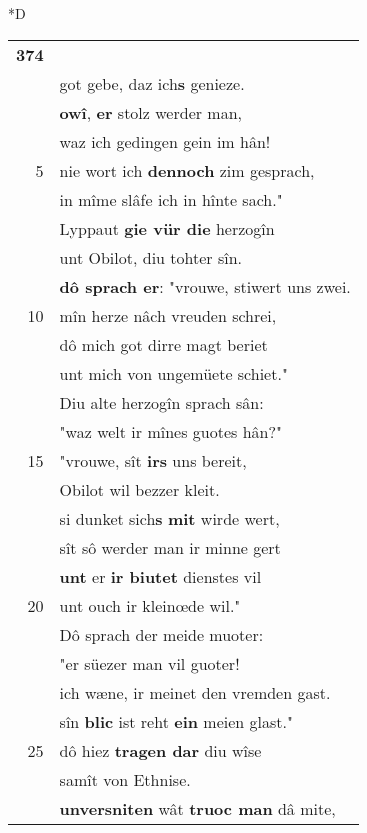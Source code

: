 \documentclass[8pt,a4paper,notitlepage]{article}
\begin{document}
\begin{table}[ht]
\begin{minipage}[t]{0.5\linewidth}
\small
\begin{center}*D
\end{center}
\begin{tabular}{rl}
\textbf{374} & \textit{\begin{large}O\end{large}}b dich halt dîn muoter lieze.\\ 
 & got gebe, daz ich\textbf{s} genieze.\\ 
 & \textbf{owî}, \textbf{er} stolz werder man,\\ 
 & waz ich gedingen gein im hân!\\ 
5 & nie wort ich \textbf{dennoch} zim gesprach,\\ 
 & in mîme slâfe ich in hînte sach."\\ 
 & Lyppaut \textbf{gie vür die} herzogîn\\ 
 & unt Obilot, diu tohter sîn.\\ 
 & \textbf{dô sprach er}: "vrouwe, stiwert uns zwei.\\ 
10 & mîn herze nâch vreuden schrei,\\ 
 & dô mich got dirre magt beriet\\ 
 & unt mich von ungemüete schiet."\\ 
 & Diu alte herzogîn sprach sân:\\ 
 & "waz welt ir mînes guotes hân?"\\ 
15 & "vrouwe, sît \textbf{irs} uns bereit,\\ 
 & Obilot wil bezzer kleit.\\ 
 & si dunket sich\textbf{s} \textbf{mit} wirde wert,\\ 
 & sît sô werder man ir minne gert\\ 
 & \textbf{unt} er \textbf{ir biutet} dienstes vil\\ 
20 & unt ouch ir kleinœde wil."\\ 
 & Dô sprach der meide muoter:\\ 
 & "er süezer man vil guoter!\\ 
 & ich wæne, ir meinet den vremden gast.\\ 
 & sîn \textbf{blic} ist reht \textbf{ein} meien glast."\\ 
25 & dô hiez \textbf{tragen dar} diu wîse\\ 
 & samît von Ethnise.\\ 
 & \textbf{unversniten} wât \textbf{truoc man} dâ mite,\\ 

\end{tabular}
\end{minipage}
\end{table}
\end{document}
